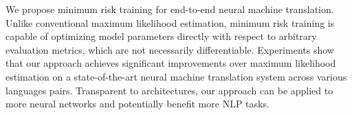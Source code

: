We propose minimum risk training for end-to-end neural machine translation. Unlike conventional maximum likelihood estimation, minimum risk training is capable of optimizing model parameters directly with respect to arbitrary evaluation metrics, which are not necessarily differentiable. Experiments show that our approach achieves significant improvements over maximum likelihood estimation on a state-of-the-art neural machine translation system across various languages pairs. Transparent to architectures, our approach can be applied to more neural networks and potentially benefit more NLP tasks.
